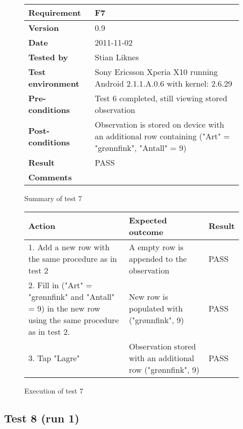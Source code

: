 	\begin{figure}[htb]
		\centering
		\begin{tabular}{|p{3.5cm}|p{7.0cm}|} \hline
			\textbf{Requirement} & F7 \\ \hline
			\textbf{Version} & 0.9 \\ \hline
			\textbf{Date} & 2011-11-02 \\ \hline
			\textbf{Tested by} & Stian Liknes \\ \hline
			\textbf{Test environment} & Sony Ericsson Xperia X10 running Android 2.1.1.A.0.6 with kernel: 2.6.29 \\ \hline
			\textbf{Pre-conditions} & Test 6 completed, still viewing stored observation \\ \hline
			\textbf{Post-conditions} & Observation is stored on device with an additional row containing ("Art" = "grønnfink", "Antall" = 9) \\ \hline
			\textbf{Result} & PASS \\ \hline
			\textbf{Comments} & \\ \hline
		\end{tabular}
		\caption{Summary of test 7}
	\end{figure}

	\begin{figure}[htb]
		\centering
		\begin{tabular}{|p{5.0cm}|p{5.0cm}|p{1cm}|}
			\hline \textbf{Action} & \textbf{Expected outcome} & \textbf{Result} \\ \hline

			1. Add a new row with the same procedure as in test 2 &
			A empty row is appended to the observation &
			PASS \\ \hline

			2. Fill in ("Art" = "grønnfink" and "Antall" = 9) in the new row
			using the same procedure as in test 2. &
			New row is populated with ("grønnfink", 9) &
			PASS \\ \hline

			3. Tap "Lagre" &
			Observation stored with an additional row ("grønnfink", 9) &
			PASS \\ \hline

		\end{tabular}
		\caption{Execution of test 7}
	\end{figure}

\newpage
\subsection*{Test 8 (run 1)}

